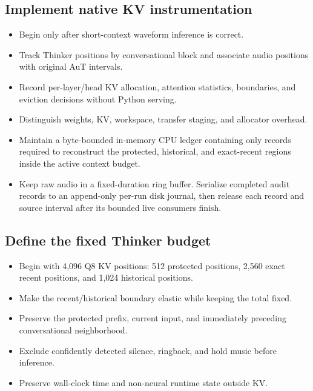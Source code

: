 \documentclass[10pt,letterpaper]{article}
\begin{document}
\subsection{Implement native KV instrumentation}
\begin{itemize}
    \item Begin only after short-context waveform inference is correct.
    \item Track Thinker positions by conversational block and associate audio positions with original AuT intervals.
    \item Record per-layer/head KV allocation, attention statistics, boundaries, and eviction decisions without Python serving.
    \item Distinguish weights, KV, workspace, transfer staging, and allocator overhead.
    \item Maintain a byte-bounded in-memory CPU ledger containing only records required to reconstruct the protected, historical, and exact-recent regions inside the active context budget.
    \item Keep raw audio in a fixed-duration ring buffer. Serialize completed audit records to an append-only per-run disk journal, then release each record and source interval after its bounded live consumers finish.
\end{itemize}

\subsection{Define the fixed Thinker budget}
\begin{itemize}
    \item Begin with 4,096 Q8 KV positions: 512 protected positions, 2,560 exact recent positions, and 1,024 historical positions.
    \item Make the recent/historical boundary elastic while keeping the total fixed.
    \item Preserve the protected prefix, current input, and immediately preceding conversational neighborhood.
    \item Exclude confidently detected silence, ringback, and hold music before inference.
    \item Preserve wall-clock time and non-neural runtime state outside KV.
\end{itemize}
\end{document}
